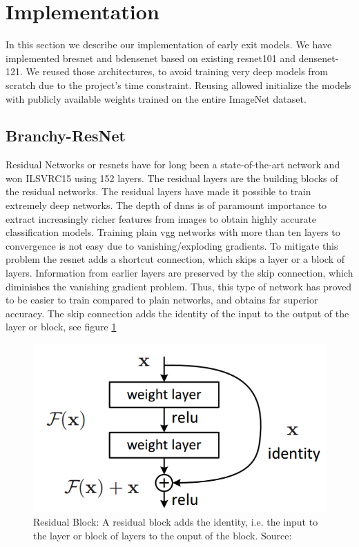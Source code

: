 \section{Implementation} \label{sec:ee-implementation}

In this section we describe our implementation of early exit models. We have implemented \gls{bresnet} and \gls{bdensenet} based on existing \gls{resnet}101 and \gls{densenet}-121. We reused those architectures, to avoid training very deep models from scratch due to the project's time constraint. Reusing allowed initialize the models with publicly available weights trained on the entire ImageNet dataset.

\subsection{Branchy-ResNet} 

Residual Networks or \gls{resnet}s \cite{he_deep_2015} have for long been a state-of-the-art network and won ILSVRC15 using 152 layers. The residual layers are the building blocks of the residual networks. The residual layers have made it possible to train extremely deep networks. The depth of \gls{dnn}s is of paramount importance to extract increasingly richer features from images to obtain highly accurate classification models. Training plain \gls{vgg} networks \cite{simonyan_very_2015} with more than ten layers to convergence is not easy due to vanishing/exploding gradients. To mitigate this problem the \gls{resnet} adds a shortcut connection, which skips a layer or a block of layers. Information from earlier layers are preserved by the skip connection, which diminishes the vanishing gradient problem. Thus, this type of network has proved to be easier to train compared to plain networks, and obtains far superior accuracy. The skip connection adds the identity of the input to the output of the layer or block, see figure \ref{fig:residualblock}

\begin{figure}
	\centering
	\includegraphics[width=.5\linewidth]{figures/models/residualblock}
	\caption[Residual Block]{Residual Block: A residual block adds the identity, i.e. the input to the layer or block of layers to the ouput of the block. Source:  \cite{he_deep_2015}}
	\label{fig:residualblock}
\end{figure}

